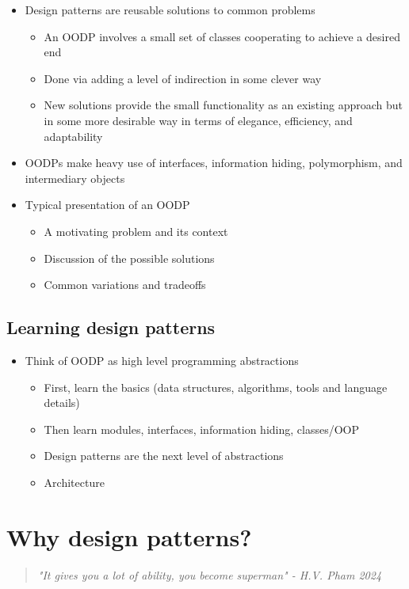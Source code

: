 \documentclass[12pt]{book}
\begin{document}
\begin{itemize}
  \item Design patterns are reusable solutions to common problems
  \begin{itemize}
    \item An OODP involves a small set of classes cooperating to achieve a desired end
    \item Done via adding a level of indirection in some clever way
    \item New solutions provide the small functionality as an existing approach but in some more desirable way in terms of elegance, efficiency, and adaptability
  \end{itemize} 

  \item OODPs make heavy use of interfaces, information hiding, polymorphism, and intermediary objects
  \item Typical presentation of an OODP
  \begin{itemize}
    \item A motivating problem and its context
    \item Discussion of the possible solutions 
    \item Common variations and tradeoffs
  \end{itemize} 
\end{itemize}

\subsection{Learning design patterns}

\begin{itemize}
  \item Think of OODP as high level programming abstractions
  \begin{itemize}
    \item First, learn the basics (data structures, algorithms, tools and language details)
    \item Then learn modules, interfaces, information hiding, classes/OOP
    \item Design patterns are the next level of abstractions
    \item Architecture
  \end{itemize} 
\end{itemize}

\section{Why design patterns?}
\begin{quote}
  \textit{"It gives you a lot of ability, you become superman" - H.V. Pham 2024}
\end{quote}
\end{document}
